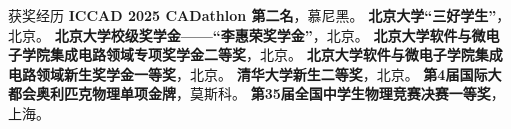 \begin{rubric}{获奖经历}
\entry*[2025]%
	\textbf{ICCAD 2025 CADathlon 第二名}，慕尼黑。
%
\entry*[2025]%
	\textbf{北京大学“三好学生”}，北京。
%
\entry*[2025]%
	\textbf{北京大学校级奖学金——“李惠荣奖学金”}，北京。
%
\entry*[2025]%
	\textbf{北京大学软件与微电子学院集成电路领域专项奖学金二等奖}，北京。
%
\entry*[2024]%
	\textbf{北京大学软件与微电子学院集成电路领域新生奖学金一等奖}，北京。
%
\entry*[2020]%
	\textbf{清华大学新生二等奖}，北京。
%
\entry*[2019]%
	\textbf{第4届国际大都会奥利匹克物理单项金牌}，莫斯科。
% 
\entry*[2018]%
	\textbf{第35届全国中学生物理竞赛决赛一等奖}，上海。
\end{rubric}
